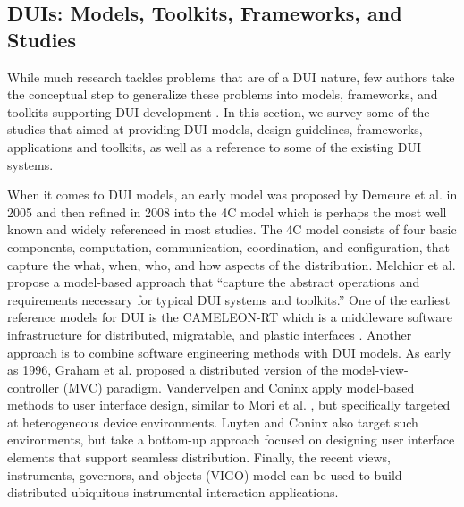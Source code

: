 \subsection{DUIs: Models, Toolkits, Frameworks, and Studies}
While much research tackles problems that are of a DUI nature, few authors take
the conceptual step to generalize these problems into models, frameworks, and
toolkits supporting DUI development \cite{elmqvist2011distributed}. In this
section, we survey some of the studies that aimed at providing DUI models,
design guidelines, frameworks, applications and toolkits, as well as a reference
to some of the existing DUI systems.\par
When it comes to DUI models, an early model was proposed by Demeure et al. in
2005 and then refined in 2008 \cite{demeure20084c} into the 4C model which is
perhaps the most well known and widely
referenced in most studies. The 4C model consists of four basic
components, computation, communication, coordination, and configuration, that
capture the what, when, who, and how aspects of the distribution. 
Melchior et al. \cite{melchior2011distributed} propose a model-based approach that ``capture the abstract operations and requirements necessary for typical DUI systems and toolkits.'' One of the
earliest reference models for DUI is the CAMELEON-RT \cite{coutaz2003software} which is a
middleware software infrastructure for distributed, migratable, and plastic
interfaces \cite{balme2004cameleon}.
Another approach is to combine software engineering methods with DUI models. As
early as 1996, Graham et al. \cite{graham1996efficient} proposed a distributed version of the
model-view-controller (MVC) paradigm. Vandervelpen and Coninx
\cite{vandervelpen2004towards} apply model-based methods to user interface
design, similar to Mori et al. \cite{mori2004design}, but specifically targeted
at heterogeneous device environments. Luyten and Coninx \cite{luyten2006designing} also target
such environments, but take a bottom-up approach focused on designing user
interface elements that support seamless distribution. Finally, the recent
views, instruments, governors, and objects (VIGO) model \cite{klokmose2009vigo} can be used
to build distributed ubiquitous instrumental interaction applications.

